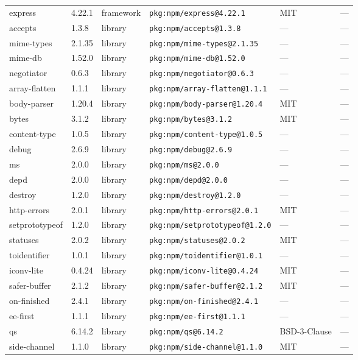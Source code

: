 \documentclass[11pt]{article}
\begin{document}
\begin{longtable}{|l|l|l|p{2.2cm}|l|p{4cm}|}
express & 4.22.1 & framework & \texttt{pkg:npm/express@4.22.1} & MIT & — \\
accepts & 1.3.8 & library & \texttt{pkg:npm/accepts@1.3.8} & — & — \\
mime-types & 2.1.35 & library & \texttt{pkg:npm/mime-types@2.1.35} & — & — \\
mime-db & 1.52.0 & library & \texttt{pkg:npm/mime-db@1.52.0} & — & — \\
negotiator & 0.6.3 & library & \texttt{pkg:npm/negotiator@0.6.3} & — & — \\
array-flatten & 1.1.1 & library & \texttt{pkg:npm/array-flatten@1.1.1} & — & — \\
body-parser & 1.20.4 & library & \texttt{pkg:npm/body-parser@1.20.4} & MIT & — \\
bytes & 3.1.2 & library & \texttt{pkg:npm/bytes@3.1.2} & MIT & — \\
content-type & 1.0.5 & library & \texttt{pkg:npm/content-type@1.0.5} & — & — \\
debug & 2.6.9 & library & \texttt{pkg:npm/debug@2.6.9} & — & — \\
ms & 2.0.0 & library & \texttt{pkg:npm/ms@2.0.0} & — & — \\
depd & 2.0.0 & library & \texttt{pkg:npm/depd@2.0.0} & — & — \\
destroy & 1.2.0 & library & \texttt{pkg:npm/destroy@1.2.0} & — & — \\
http-errors & 2.0.1 & library & \texttt{pkg:npm/http-errors@2.0.1} & MIT & — \\
setprototypeof & 1.2.0 & library & \texttt{pkg:npm/setprototypeof@1.2.0} & — & — \\
statuses & 2.0.2 & library & \texttt{pkg:npm/statuses@2.0.2} & MIT & — \\
toidentifier & 1.0.1 & library & \texttt{pkg:npm/toidentifier@1.0.1} & — & — \\
iconv-lite & 0.4.24 & library & \texttt{pkg:npm/iconv-lite@0.4.24} & MIT & — \\
safer-buffer & 2.1.2 & library & \texttt{pkg:npm/safer-buffer@2.1.2} & MIT & — \\
on-finished & 2.4.1 & library & \texttt{pkg:npm/on-finished@2.4.1} & — & — \\
ee-first & 1.1.1 & library & \texttt{pkg:npm/ee-first@1.1.1} & — & — \\
qs & 6.14.2 & library & \texttt{pkg:npm/qs@6.14.2} & BSD-3-Clause & — \\
side-channel & 1.1.0 & library & \texttt{pkg:npm/side-channel@1.1.0} & MIT & — \\

\end{longtable}
\end{document}
